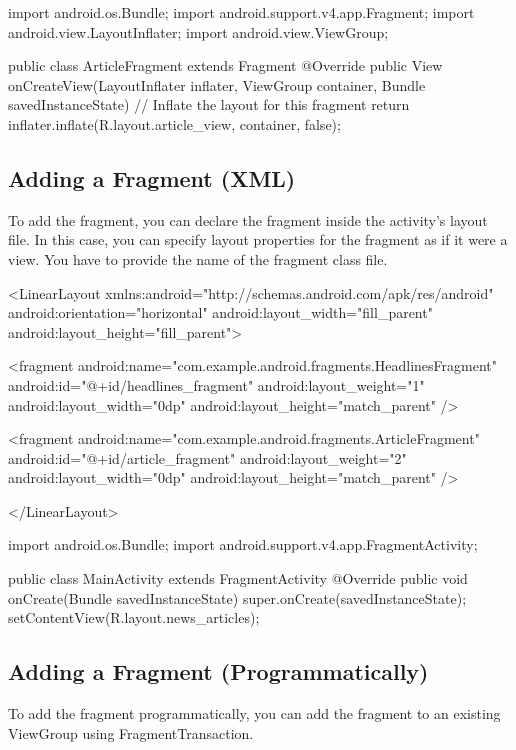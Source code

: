 \begin{android}
	import android.os.Bundle;
	import android.support.v4.app.Fragment;
	import android.view.LayoutInflater;
	import android.view.ViewGroup;
	
	public class ArticleFragment extends Fragment {
		@Override
		public View onCreateView(LayoutInflater inflater, ViewGroup container,
		Bundle savedInstanceState) {
			// Inflate the layout for this fragment
			return inflater.inflate(R.layout.article_view, container, false);
		}
	}
\end{android}

\subsection{Adding a Fragment (XML)}
To add the fragment, you can
declare the fragment inside the activity's layout file.
	In this case, you can specify layout properties for the fragment as if it were a view. You have to provide the name of the fragment class file.


\begin{xml}
	<LinearLayout xmlns:android="http://schemas.android.com/apk/res/android"
	android:orientation="horizontal"
	android:layout_width="fill_parent"
	android:layout_height="fill_parent">
	
	<fragment android:name="com.example.android.fragments.HeadlinesFragment"
	android:id="@+id/headlines_fragment"
	android:layout_weight="1"
	android:layout_width="0dp"
	android:layout_height="match_parent" />
	
	<fragment android:name="com.example.android.fragments.ArticleFragment"
	android:id="@+id/article_fragment"
	android:layout_weight="2"
	android:layout_width="0dp"
	android:layout_height="match_parent" />
	
	</LinearLayout>
\end{xml}

\begin{android}
	import android.os.Bundle;
	import android.support.v4.app.FragmentActivity;
	
	public class MainActivity extends FragmentActivity {
		@Override
		public void onCreate(Bundle savedInstanceState) {
			super.onCreate(savedInstanceState);
			setContentView(R.layout.news_articles);
		}
	}
\end{android}

\subsection{Adding a Fragment (Programmatically)}
To add the fragment programmatically, you can add the fragment to an existing ViewGroup using FragmentTransaction. 

